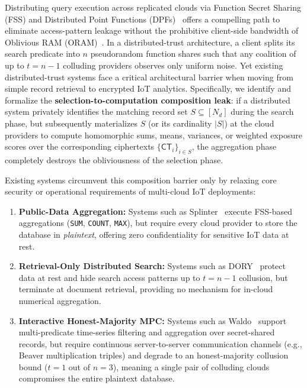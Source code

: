\documentclass[11pt,a4paper]{article}
\begin{document}
Distributing query execution across replicated clouds via Function Secret Sharing (FSS) and Distributed Point Functions (DPFs)~\cite{gilboa2014,boyle2015,boyle2016} offers a compelling path to eliminate access-pattern leakage without the prohibitive client-side bandwidth of Oblivious RAM (ORAM)~\cite{goldreich1996}. In a distributed-trust architecture, a client splits its search predicate into $n$ pseudorandom function shares such that any coalition of up to $t = n - 1$ colluding providers observes only uniform noise. Yet existing distributed-trust systems face a critical architectural barrier when moving from simple record retrieval to encrypted IoT analytics. Specifically, we identify and formalize the \textbf{selection-to-computation composition leak}: if a distributed system privately identifies the matching record set $S \subseteq [N_d]$ during the search phase, but subsequently materializes $S$ (or its cardinality $|S|$) at the cloud providers to compute homomorphic sums, means, variances, or weighted exposure scores over the corresponding ciphertexts $\{\mathsf{CT}_i\}_{i \in S}$, the aggregation phase completely destroys the obliviousness of the selection phase.

Existing systems circumvent this composition barrier only by relaxing core security or operational requirements of multi-cloud IoT deployments:
\begin{enumerate}\setlength{\itemsep}{2pt}\setlength{\parskip}{0pt}
    \item \textbf{Public-Data Aggregation:} Systems such as Splinter~\cite{wang2017} execute FSS-based aggregations (\texttt{SUM}, \texttt{COUNT}, \texttt{MAX}), but require every cloud provider to store the database in \textit{plaintext}, offering zero confidentiality for sensitive IoT data at rest.
    \item \textbf{Retrieval-Only Distributed Search:} Systems such as DORY~\cite{dauterman2020} protect data at rest and hide search access patterns up to $t = n - 1$ collusion, but terminate at document retrieval, providing no mechanism for in-cloud numerical aggregation.
    \item \textbf{Interactive Honest-Majority MPC:} Systems such as Waldo~\cite{dauterman2022} support multi-predicate time-series filtering and aggregation over secret-shared records, but require continuous server-to-server communication channels (e.g., Beaver multiplication triples) and degrade to an honest-majority collusion bound ($t = 1$ out of $n = 3$), meaning a single pair of colluding clouds compromises the entire plaintext database.
\end{enumerate}
\end{document}
